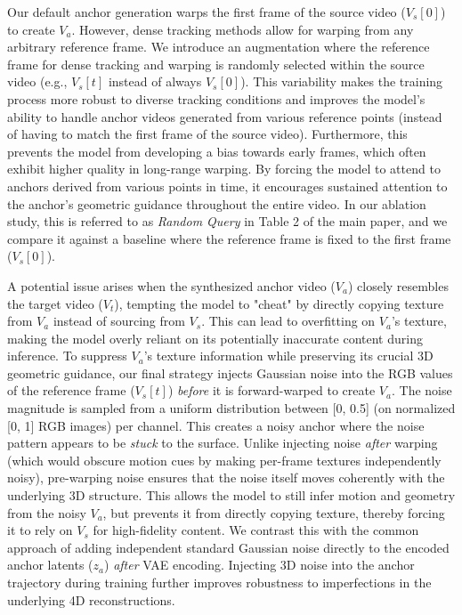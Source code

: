 \begin{description}[noitemsep, topsep=0pt, partopsep=0pt, leftmargin=0pt, style=unboxed, font=\normalfont\bfseries]
    \item[Flexible Anchor Reference Frame Warping] Our default anchor generation warps the first frame of the source video ($V_s[0]$) to create $V_a$. However, dense tracking methods allow for warping from any arbitrary reference frame. We introduce an augmentation where the reference frame for dense tracking and warping is randomly selected within the source video (e.g., $V_s[t]$ instead of always $V_s[0]$). This variability makes the training process more robust to diverse tracking conditions and improves the model's ability to handle anchor videos generated from various reference points (instead of having to match the first frame of the source video). Furthermore, this prevents the model from developing a bias towards early frames, which often exhibit higher quality in long-range warping. By forcing the model to attend to anchors derived from various points in time, it encourages sustained attention to the anchor's geometric guidance throughout the entire video. In our ablation study, this is referred to as \textit{Random Query} in Table 2 of the main paper, and we compare it against a baseline where the reference frame is fixed to the first frame ($V_s[0]$).

    \item[3D-Aware Noise Injection vs. Latent Noise] A potential issue arises when the synthesized anchor video ($V_a$) closely resembles the target video ($V_t$), tempting the model to "cheat" by directly copying texture from $V_a$ instead of sourcing from $V_s$. This can lead to overfitting on $V_a$'s texture, making the model overly reliant on its potentially inaccurate content during inference. To suppress $V_a$'s texture information while preserving its crucial 3D geometric guidance, our final strategy injects Gaussian noise into the RGB values of the reference frame ($V_s[t]$) \textit{before} it is forward-warped to create $V_a$. The noise magnitude is sampled from a uniform distribution between [0, 0.5] (on normalized [0, 1] RGB images) per channel. This creates a noisy anchor where the noise pattern appears to be \textit{stuck} to the surface. Unlike injecting noise \textit{after} warping (which would obscure motion cues by making per-frame textures independently noisy), pre-warping noise ensures that the noise itself moves coherently with the underlying 3D structure. This allows the model to still infer motion and geometry from the noisy $V_a$, but prevents it from directly copying texture, thereby forcing it to rely on $V_s$ for high-fidelity content. We contrast this with the common approach of adding independent standard Gaussian noise directly to the encoded anchor latents ($z_a$) \textit{after} VAE encoding. Injecting 3D noise into the anchor trajectory during training further improves robustness to imperfections in the underlying 4D reconstructions.
\end{description}

